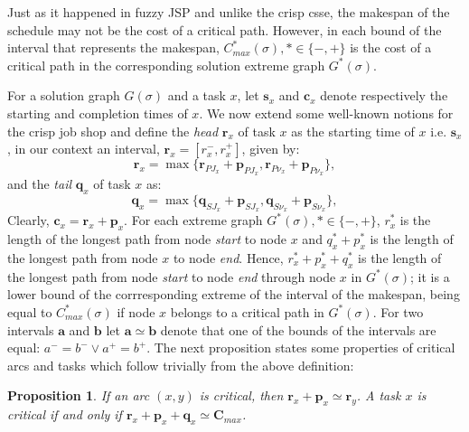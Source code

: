 \documentclass[preprint]{elsarticle}
\newtheorem{proposition}{Proposition}
\begin{document}
Just as it happened in fuzzy JSP and unlike the crisp csse, the makespan of the schedule may not be the cost of a critical path. However, in each bound of the interval that represents the makespan, $C_{max}^*(\sigma), *\in \{-,+\}$ is the cost of a critical path in the corresponding solution extreme graph $G^*(\sigma)$.

For a solution graph $G(\sigma)$ and a task $x$, let $\mathbf{s}_x$ and $\mathbf{c}_x$ denote respectively the starting and completion times of $x$. We now extend some well-known notions for the crisp job shop and define the \emph{head} $\mathbf{r}_x$ of task $x$ as the starting time of $x$ i.e. $\mathbf{s}_x$, in our context an interval, $\mathbf{r}_x=[r_x^-, r_x^+]$, given by:
\begin{equation}\label{eqHeadrx}
\mathbf{r}_x = \max\{\mathbf{r}_{PJ_x} + \mathbf{p}_{PJ_x}, \mathbf{r}_{P\nu_x} + \mathbf{p}_{P\nu_x}\},
\end{equation}
and the \emph{tail} $\mathbf{q}_x$ of task $x$ as:
\begin{equation}\label{eqTailqx}
\mathbf{q}_x = \max\{\mathbf{q}_{SJ_x} + \mathbf{p}_{SJ_x}, \mathbf{q}_{S\nu_x} + \mathbf{p}_{S\nu_x}\},
\end{equation}
Clearly, $\mathbf{c}_x = \mathbf{r}_x + \mathbf{p}_x$. For each extreme graph $G^*(\sigma), *\in \{-,+\}$, $r_x^*$ is the length of the longest path from node \emph{start} to node $x$ and $q_x^*+p_x^*$ is the length of the longest path from node $x$ to node \emph{end}. Hence, $r_x^*+p_x^*+q_x^*$ is the length of the longest path from node \emph{start} to node \emph{end} through node $x$ in $G^*(\sigma)$; it is a lower bound of the corrresponding extreme of the interval of the makespan, being equal to $C_{max}^*(\sigma)$ if node $x$ belongs to a critical path in $G^*(\sigma)$. For two intervals $\mathbf{a}$ and $\mathbf{b}$ let $\mathbf{a} \simeq  \mathbf{b}$ denote that one of the bounds of the intervals are equal: $a^- = b^- \lor a^+ = b^+$. The next proposition states some properties of critical arcs and tasks which follow trivially from the above definition:
\begin{proposition}\label{propPropertiesCriticalArcs}
If an arc $(x,y)$ is critical, then $\mathbf{r}_x + \mathbf{p}_x \simeq \mathbf{r}_y$. A task $x$ is critical if and only if $\mathbf{r}_x + \mathbf{p}_x + \mathbf{q}_x \simeq \mathbf{C}_{max}$.
\end{proposition}
\end{document}
